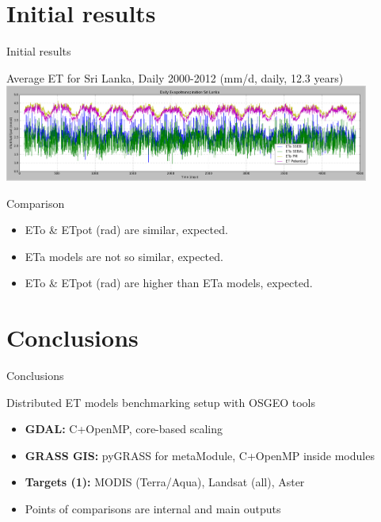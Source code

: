 \documentclass[xcolor=dvipsnames,beamer]{beamer} %
\begin{document}
\section{Initial results}
\begin{frame}[fragile]{Initial results}

\begin{center}
 Average ET for Sri Lanka, Daily 2000-2012 (mm/d, daily, 12.3 years)
 \includegraphics[width=12cm]{sltemporaletb}
\end{center}

\begin{block}{Comparison}
\begin{itemize}
 \item ETo \& ETpot (rad) are similar, expected.
 \item ETa models are not so similar, expected.
 \item ETo \& ETpot (rad) are higher than ETa models, expected.
\end{itemize}

\end{block}

\end{frame}

\section{Conclusions}
\begin{frame}[fragile]{Conclusions}

\begin{block}{Distributed ET models benchmarking setup with OSGEO tools}
\begin{itemize}
 \item {\bf GDAL:} C+OpenMP, core-based scaling
 \item {\bf GRASS GIS:} pyGRASS for metaModule, C+OpenMP inside modules
 \item {\bf Targets (1):} MODIS (Terra/Aqua), Landsat (all), Aster
 \item Points of comparisons are internal and main outputs
\end{itemize}
\end{block}

\end{frame}
\end{document}
